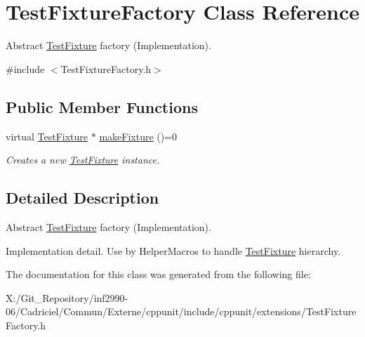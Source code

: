 \hypertarget{class_test_fixture_factory}{\section{Test\-Fixture\-Factory Class Reference}
\label{class_test_fixture_factory}
}


Abstract \hyperlink{class_test_fixture}{Test\-Fixture} factory (Implementation).  




{\ttfamily \#include $<$Test\-Fixture\-Factory.\-h$>$}

\subsection*{Public Member Functions}
\begin{DoxyCompactItemize}
\item 
\hypertarget{class_test_fixture_factory_a50ae33b88d818ef819478e47929a820c}{virtual \hyperlink{class_test_fixture}{Test\-Fixture} $\ast$ \hyperlink{class_test_fixture_factory_a50ae33b88d818ef819478e47929a820c}{make\-Fixture} ()=0}\label{class_test_fixture_factory_a50ae33b88d818ef819478e47929a820c}

\begin{DoxyCompactList}\small\item\em Creates a new \hyperlink{class_test_fixture}{Test\-Fixture} instance. \end{DoxyCompactList}\end{DoxyCompactItemize}


\subsection{Detailed Description}
Abstract \hyperlink{class_test_fixture}{Test\-Fixture} factory (Implementation). 

Implementation detail. Use by Helper\-Macros to handle \hyperlink{class_test_fixture}{Test\-Fixture} hierarchy. 

The documentation for this class was generated from the following file\-:\begin{DoxyCompactItemize}
\item 
X\-:/\-Git\-\_\-\-Repository/inf2990-\/06/\-Cadriciel/\-Commun/\-Externe/cppunit/include/cppunit/extensions/Test\-Fixture\-Factory.\-h\end{DoxyCompactItemize}
